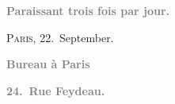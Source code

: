 \pstart
           \begin{otherlanguage}{french}\textcolor{gray}{\textbf{\textbf{Paraissant trois fois par jour.}}}\end{otherlanguage}\hfill \textsc{Paris}, 22. September.\pend
           
\pstart
           \begin{otherlanguage}{french}\textcolor{gray}{\textbf{\textbf{Bureau à Paris}}}\end{otherlanguage}\pend
           
\pstart
           \begin{otherlanguage}{french}\textcolor{gray}{\textbf{\textbf{24. Rue Feydeau.}}}\end{otherlanguage}\pend
           
